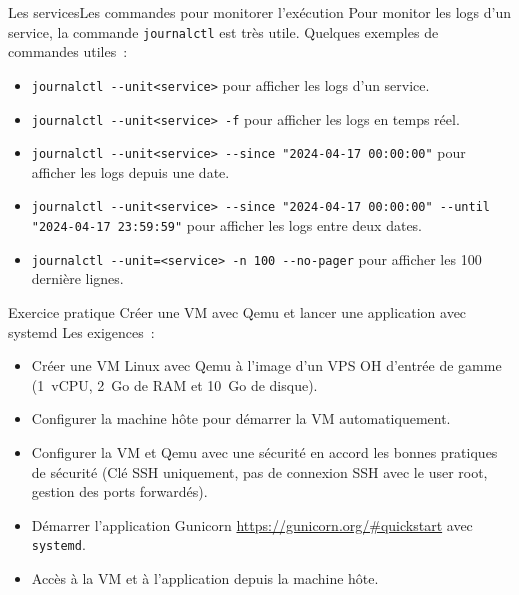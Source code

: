 \documentclass{beamer}
\begin{document}
    \begin{frame}{Les services}{Les commandes pour monitorer l'exécution}
        Pour monitor les logs d'un service, la commande \lstinline{journalctl} est très utile.
        \bigbreak
        Quelques exemples de commandes utiles~:
        \begin{itemize}
            \item \lstinline{journalctl --unit<service>} pour afficher les logs d'un service.
            \item \lstinline{journalctl --unit<service> -f} pour afficher les logs en temps réel.
            \item \lstinline{journalctl --unit<service> --since "2024-04-17 00:00:00"} pour afficher les logs depuis une date.
            \item \lstinline{journalctl --unit<service> --since "2024-04-17 00:00:00" --until "2024-04-17 23:59:59"} pour afficher les logs entre deux dates.
            \item \lstinline{journalctl --unit=<service> -n 100 --no-pager} pour afficher les 100 dernière lignes.
        \end{itemize}
    \end{frame}

    \begin{frame}{Exercice pratique \execcounterdispinc{}}{Créer une VM avec Qemu et lancer une application avec systemd}
        Les exigences~:
        \begin{itemize}
            \item Créer une VM Linux avec Qemu à l'image d'un VPS OH d'entrée de gamme (1~vCPU, 2~Go de RAM et 10~Go de disque).
            \item Configurer la machine hôte pour démarrer la VM automatiquement.
            \item Configurer la VM et Qemu avec une sécurité en accord les bonnes pratiques de sécurité (Clé SSH uniquement, pas de connexion SSH avec le user root, gestion des ports forwardés).
            \item Démarrer l'application Gunicorn  \url{https://gunicorn.org/\#quickstart} avec \lstinline{systemd}.
            \item Accès à la VM et à l'application depuis la machine hôte.
        \end{itemize}
    \end{frame}
\end{document}
